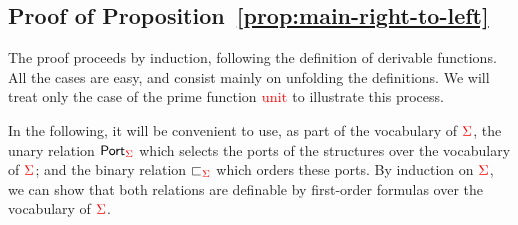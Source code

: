 \subsection{Proof of Proposition~\ref{prop:main-right-to-left}}
The proof proceeds by induction, following the definition of derivable functions. All the cases are easy, and consist mainly on unfolding the definitions. We will treat only the case of the prime function ${\color{red}{\mathrm{unit}}}$  to illustrate this process.
    
    In the following, it will be convenient to use, as part of the vocabulary of ${\color{red}{\Sigma}}$, the unary relation  $\mathsf{Port}_{\color{red}{\Sigma}}$ which selects the ports of the structures over the vocabulary of ${\color{red}{\Sigma}}$; and the binary relation $\sqsubset_{\color{red}{\Sigma}}$ which orders these ports. By induction on ${\color{red}{\Sigma}}$, we can show that both relations are definable by first-order formulas over  the vocabulary of ${\color{red}{\Sigma}}$.
    
